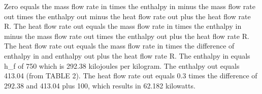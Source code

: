 Zero equals the mass flow rate in times the enthalpy in minus the mass flow rate out times the enthalpy out minus the heat flow rate out plus the heat flow rate R. The heat flow rate out equals the mass flow rate in times the enthalpy in minus the mass flow rate out times the enthalpy out plus the heat flow rate R. The heat flow rate out equals the mass flow rate in times the difference of enthalpy in and enthalpy out plus the heat flow rate R. The enthalpy in equals h_f of 750 which is 292.38 kilojoules per kilogram. The enthalpy out equals 413.04 (from TABLE 2). The heat flow rate out equals 0.3 times the difference of 292.38 and 413.04 plus 100, which results in 62.182 kilowatts.